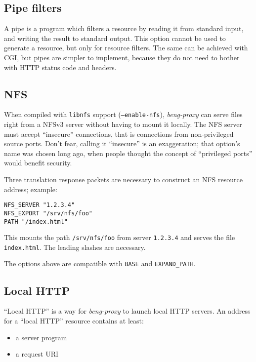 \documentclass[a4paper,12pt]{article}
\begin{document}
\subsection{Pipe filters}
\label{pipe}

A pipe is a program which filters a resource by reading it from
standard input, and writing the result to standard output.  This
option cannot be used to generate a resource, but only for resource
filters.  The same can be achieved with CGI, but pipes are simpler to
implement, because they do not need to bother with HTTP status code
and headers.

\subsection{NFS}
\label{nfs}

When compiled with \texttt{libnfs} support (\texttt{--enable-nfs}),
\emph{beng-proxy} can serve files right from a NFSv3 server without
having to mount it locally.  The NFS server must accept ``insecure''
connections, that is connections from non-privileged source ports.
Don't fear, calling it ``insecure'' is an exaggeration; that option's
name was chosen long ago, when people thought the concept of
``privileged ports'' would benefit security.

Three translation response packets are necessary to construct an NFS
resource address; example:

\begin{verbatim}
NFS_SERVER "1.2.3.4"
NFS_EXPORT "/srv/nfs/foo"
PATH "/index.html"
\end{verbatim}

This mounts the path \texttt{/srv/nfs/foo} from server
\texttt{1.2.3.4} and serves the file \texttt{index.html}.  The
leading slashes are necessary.

The options above are compatible with \verb|BASE| and
\verb|EXPAND_PATH|.

\subsection{Local HTTP}
\label{lhttp}

``Local HTTP'' is a way for \emph{beng-proxy} to launch local HTTP
servers.  An address for a ``local HTTP'' resource contains at least:

\begin{itemize}
\item a server program
\item a request URI
\end{itemize}
\end{document}
